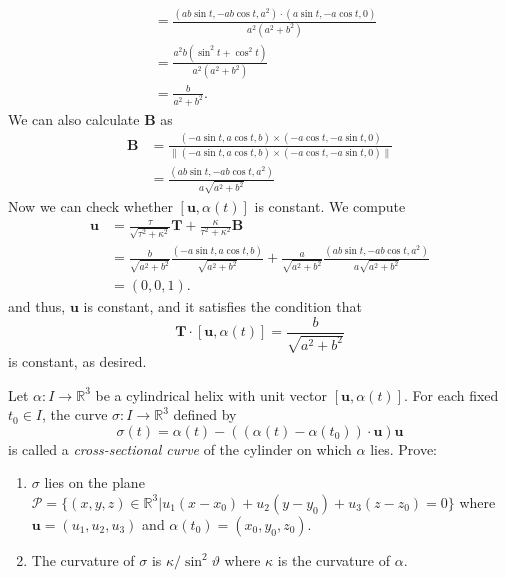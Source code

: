 \documentclass[12 pt, letterpaper]{hmcpset}
\begin{document}
\begin{solution}
\begin{enumerate}
\[\begin{split}
					     & = \frac{(ab \sin{t}, - ab \cos{t}, a^{2}) \cdot (a \sin{t}, -a \cos{t}, 0)}{a^{2}(a^{2} + b^{2})} \\
					     & = \frac{a^{2}b(\sin^{2}{t} + \cos^{2}{t})}{a^{2}(a^{2} + b^{2})} \\
					     & = \frac{b}{a^{2} + b^{2}}.
				\end{split}
			\]
			We can also calculate $\mathbf{B}$ as
			\[
				\begin{split}
					\mathbf{B} & = \frac{(- a \sin{t}, a \cos{t}, b) \times (- a \cos{t}, - a \sin{t}, 0)}{\lVert (- a \sin{t}, a \cos{t}, b) \times (- a \cos{t}, - a \sin{t}, 0) \rVert} \\
						   & = \frac{(ab \sin{t}, - ab \cos{t}, a^{2})}{a \sqrt{a^{2} + b^{2}}}
				\end{split}
			\]
			Now we can check whether $[\mathbf{u}, \alpha(t)]$ is constant. We compute
			 \[
				\begin{split}
					\mathbf{u} & = \frac{\tau}{\sqrt{\tau^{2} + \kappa^{2}}} \mathbf{T} + \frac{\kappa}{\tau^{2} + \kappa^{2}} \mathbf{B} \\
						   & = \frac{b}{\sqrt{a^{2} + b^{2}}} \frac{(- a \sin{t}, a \cos{t}, b)}{\sqrt{a^{2} + b^{2}}} + \frac{a}{\sqrt{a^{2} + b^{2}}} \frac{(ab \sin{t}, - ab \cos{t}, a^{2})}{a \sqrt{a^{2} + b^{2}}} \\
						   & = (0, 0, 1).
				\end{split}
			\]
			and thus, $\mathbf{u}$ is constant, and it satisfies the condition that
			\[
				\mathbf{T} \cdot [\mathbf{u}, \alpha(t)] = \frac{b}{\sqrt{a^{2} + b^{2}}}
			\]
			is constant, as desired.
	\end{enumerate}
\end{solution}

\pagebreak

\begin{problem}[Problem 3.]
	Let $\alpha : I \to \mathbb{R}^{3}$ be a cylindrical helix with unit vector $[\mathbf{u}, \alpha(t)]$. For each fixed $t_{0} \in I$, the curve $\sigma : I \to \mathbb{R}^{3}$ defined by
	\[
		\sigma(t) = \alpha(t) - ((\alpha(t) - \alpha(t_{0})) \cdot \mathbf{u}) \mathbf{u}
	\]
	is called a \textit{cross-sectional curve} of the cylinder on which $\alpha$ lies. Prove:
	\begin{enumerate}
		\item $\sigma$ lies on the plane $\mathcal{P} = \{ (x, y, z) \in \mathbb{R}^{3} | u_{1}(x - x_{0}) + u_{2}(y - y_{0}) + u_{3}(z - z_{0}) = 0 \}$ where $\mathbf{u} = (u_{1}, u_{2}, u_{3})$ and $\alpha(t_{0}) = (x_{0}, y_{0}, z_{0})$. 
		\item The curvature of $\sigma$ is $\kappa/\sin^{2}{\vartheta}$ where $\kappa$ is the curvature of $\alpha$.
	\end{enumerate}
\end{problem}
\end{document}
